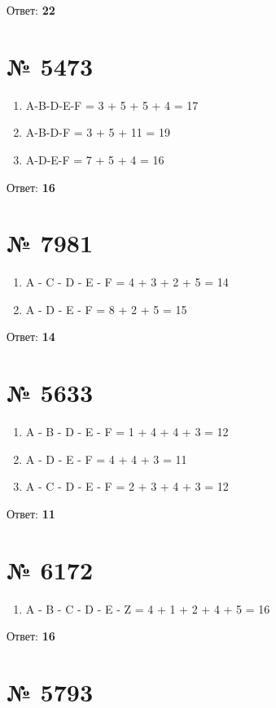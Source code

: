 \documentclass[11pt]{article} %
\begin{document}
Ответ: \textbf{22}

\section{№ \textbf{5473}}

\begin{enumerate}
	\item A-B-D-E-F = 3 + 5 + 5 + 4 = 17
	\item A-B-D-F = 3 + 5 + 11 = 19
	\item A-D-E-F = 7 + 5 + 4 = 16
\end{enumerate}

Ответ: \textbf{16}

\section{№ \textbf{7981}}

\begin{enumerate}
	\item A - C - D - E - F = 4 + 3 + 2 + 5 = 14
	\item A - D - E - F = 8 + 2 + 5 = 15
\end{enumerate}

Ответ: \textbf{14}

\section{№ \textbf{5633}}

\begin{enumerate}
	\item A - B - D - E - F = 1 + 4 + 4 + 3 = 12 
	\item A - D - E - F = 4 + 4 + 3 = 11
	\item A - C - D - E - F = 2 + 3 + 4 + 3 = 12
\end{enumerate}

Ответ: \textbf{11}

\section{№ \textbf{6172}}

\begin{enumerate}
	\item A - B - C - D - E - Z = 4 + 1 + 2 + 4 + 5 = 16
\end{enumerate}

Ответ: \textbf{16}

\section{№ \textbf{5793}}
\end{document}
